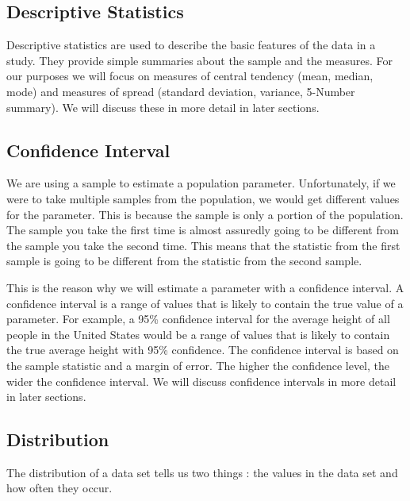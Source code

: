 \documentclass[
  letterpaper,
  DIV=11,
  numbers=noendperiod]{scrreprt}
\begin{document}
\subsection*{Descriptive Statistics}\label{descriptive-statistics}

Descriptive statistics are used to describe the basic features of the
data in a study. They provide simple summaries about the sample and the
measures. For our purposes we will focus on measures of central tendency
(mean, median, mode) and measures of spread (standard deviation,
variance, 5-Number summary). We will discuss these in more detail in
later sections.

\subsection*{Confidence Interval}\label{confidence-interval}

We are using a sample to estimate a population parameter. Unfortunately,
if we were to take multiple samples from the population, we would get
different values for the parameter. This is because the sample is only a
portion of the population. The sample you take the first time is almost
assuredly going to be different from the sample you take the second
time. This means that the statistic from the first sample is going to be
different from the statistic from the second sample.

This is the reason why we will estimate a parameter with a confidence
interval. A confidence interval is a range of values that is likely to
contain the true value of a parameter. For example, a 95\% confidence
interval for the average height of all people in the United States would
be a range of values that is likely to contain the true average height
with 95\% confidence. The confidence interval is based on the sample
statistic and a margin of error. The higher the confidence level, the
wider the confidence interval. We will discuss confidence intervals in
more detail in later sections.

\subsection*{Distribution}\label{distribution}

The distribution of a data set tells us two things : the values in the
data set and how often they occur.
\end{document}
